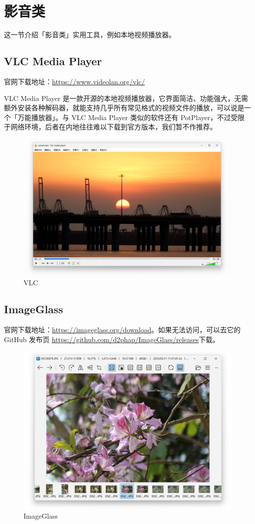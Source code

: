 \section{影音类}

这一节介绍「影音类」实用工具，例如本地视频播放器。

\subsection{VLC Media Player}

官网下载地址：\url{https://www.videolan.org/vlc/}

VLC Media Player 是一款开源的本地视频播放器，它界面简洁、功能强大，无需额外安装各种解码器，就能支持几乎所有常见格式的视频文件的播放，可以说是一个「万能播放器」。与 VLC Media Player 类似的软件还有 PotPlayer，不过受限于网络环境，后者在内地往往难以下载到官方版本，我们暂不作推荐。

\begin{figure}[htb!]
  \centering
  \includegraphics[width=.7\textwidth]{assets/software/VLC.png}
  \caption{VLC}
  \label{fig:VLC}
\end{figure}

\subsection{ImageGlass}

官网下载地址：\url{https://imageglass.org/download}。如果无法访问，可以去它的 GitHub 发布页 \url{https://github.com/d2phap/ImageGlass/releases}下载。

\begin{figure}[htb!]
  \centering
  \includegraphics[width=.6\textwidth]{assets/software/ImageGlass.png}
  \caption{ImageGlass}
  \label{fig:ImageGlass}
\end{figure}

